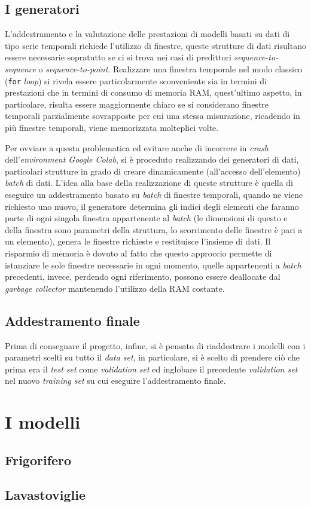 \documentclass[12pt,a4paper,fleqn]{article}
\begin{document}
\subsection{I generatori}
L'addestramento e la valutazione delle prestazioni di modelli basati su dati di tipo serie temporali richiede l'utilizzo di finestre, queste strutture di dati risultano essere necessarie sopratutto se ci si trova nei casi di predittori \textsl{sequence-to-sequence} o \textsl{sequence-to-point}. Realizzare una finestra temporale nel modo classico (\texttt{for} \textit{loop}) si rivela essere particolarmente sconveniente sia in termini di prestazioni che in termini di consumo di memoria RAM, quest'ultimo aspetto, in particolare, risulta essere maggiormente chiaro se si considerano finestre temporali parzialmente sovrapposte per cui una stessa misurazione, ricadendo in più finestre temporali, viene memorizzata molteplici volte.

Per ovviare a questa problematica ed evitare anche di incorrere in \textsl{crash} dell'\textsl{environment Google Colab}, si è proceduto realizzando dei generatori di dati, particolari strutture in grado di creare dinamicamente (all'accesso dell'elemento) \textsl{batch} di dati. L'idea alla base della realizzazione di queste strutture è quella di eseguire un addestramento basato su \textsl{batch} di finestre temporali, quando ne viene richiesto uno nuovo, il generatore determina gli indici degli elementi che faranno parte di ogni singola finestra appartenente al \textsl{batch} (le dimensioni di questo e della finestra sono parametri della struttura, lo scorrimento delle finestre è pari a un elemento), genera le finestre richieste e restituisce l'insieme di dati. Il risparmio di memoria è dovuto al fatto che questo approccio permette di istanziare le sole finestre necessarie in ogni momento, quelle appartenenti a \textsl{batch} precedenti, invece, perdendo ogni riferimento, possono essere deallocate dal \textsl{garbage collector} mantenendo l'utilizzo della RAM costante.

\subsection{Addestramento finale}
Prima di consegnare il progetto, infine, si è pensato di riaddestrare i modelli con i parametri scelti su tutto il \textsl{data set}, in particolare, si è scelto di prendere ciò che prima era il \textsl{test set} come \textsl{validation set} ed inglobare il precedente \textsl{validation set} nel nuovo \textsl{training set} su cui eseguire l'addestramento finale.

\section{I modelli}

\subsection{Frigorifero}

\subsection{Lavastoviglie}


\end{document}
